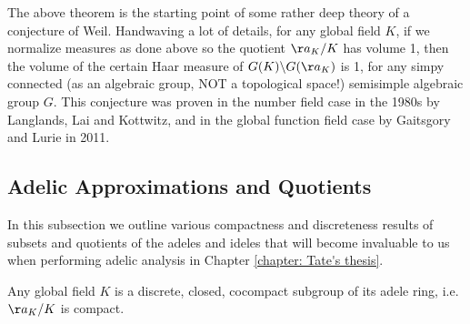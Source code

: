 \documentclass[11pt, x11names, openany]{book}
\begin{document}
\begin{remark}
    The above theorem is the starting point of some rather deep theory of a conjecture of Weil. Handwaving a lot of details, for any global field $K$, if we normalize measures as done above so the quotient $\aa_K/K$ has volume 1, then the volume of the certain Haar measure of $  G(K)\backslash G(\aa_K)$ is 1, for any simpy connected (as an algebraic group, NOT a topological space!) semisimple algebraic group $G$. This conjecture was proven in the number field case in the 1980s by Langlands, Lai and Kottwitz, and in the global function field case by Gaitsgory and Lurie in 2011.
\end{remark}


\subsection{Adelic Approximations and Quotients} 
\label{subsection: Adelic Approximations and Quotients}

In this subsection we outline various compactness and discreteness results of subsets and quotients of the adeles and ideles that will become invaluable to us when performing adelic analysis in Chapter \ref{chapter: Tate's thesis}.

\begin{theorem}
\label{thm: K discrete and cocompact in A_K}
Any global field $K$ is a discrete, closed, cocompact subgroup of its adele ring, i.e. $\aa_K/K$ is compact.
\end{theorem}
\end{document}
